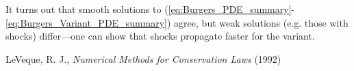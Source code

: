 \documentclass[12pt]{article}
\numberwithin{equation}{section}
\begin{document}
It turns out that smooth solutions to (\ref{eq:Burgers_PDE_summary}-
\ref{eq:Burgers_Variant_PDE_summary}) agree, but weak solutions (e.g. those
with shocks) differ---one can show that shocks propagate faster for the variant.

\clearpage

\begin{thebibliography}{10}
 LeVeque, R. J.,
    \textit{Numerical Methods for Conservation Laws} (1992)
\end{thebibliography}
\end{document}
